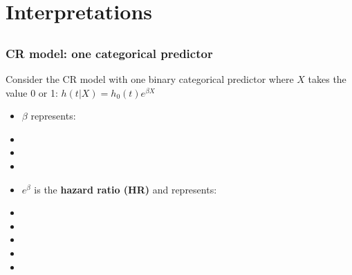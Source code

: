 \section[Interpretations]{Interpretations}
\subsection{}
\begin{frame}
\end{frame}

\begin{frame}
\frametitle{CR model: one categorical predictor}
Consider the CR model with one binary categorical predictor where $X$ takes the value 0 or 1:
$\displaystyle h(t|X) = h_0(t)e^{\beta X}$
\begin{itemize}
\item $\beta$ represents:
\item[]
\item[]
\item[]
\item  $e^\beta$ is the \textbf{hazard ratio (HR)} and represents:
\item[]
\item[]
\item[]
\item[]
\item[]
\end{itemize}
\end{frame}

